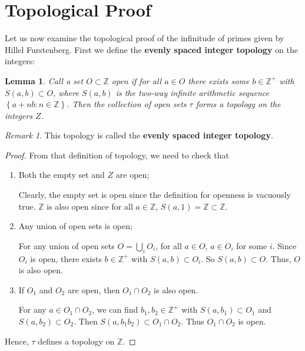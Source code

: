 \documentclass[a4paper]{article}
\newtheorem{lemma}[theorem]{Lemma}
\theoremstyle{definition}
\theoremstyle{remark}
\newtheorem*{remark}{Remark}
\begin{document}
\section{Topological Proof}
Let us now examine the topological proof of the infinitude of primes given by Hillel Furstenberg.
First we define the \textbf{evenly spaced integer topology} on the integers:
\begin{lemma}
  Call a set $O\subset\mathbb{Z}$ open if for all $a\in O$ there exists some $b\in\mathbb{Z^+}$ with $S(a,b)\subset O$, where $S(a,b)$ is the two-way infinite arithmetic sequence $\left\{ a+nb:n\in\mathbb{Z} \right\}$. Then the collection of open sets $\tau$ forms a topology on the integers $Z$.
  \label{lem:esip}
\end{lemma}
\begin{remark}
  This topology is called the \textbf{evenly spaced integer topology}.
  \label{rem:esip}
\end{remark}
\begin{proof}
  From that definition of topology, we need to check that
  \begin{enumerate}
    \item Both the empty set and $Z$ are open;

      Clearly, the empty set is open since the definition for openness is vacuously true. $\mathbb{Z}$ is also open since for all $a\in\mathbb{Z}$, $S(a,1)=\mathbb{Z}\subset\mathbb{Z}$.
    \item Any union of open sets is open;

      For any union of open sets $O=\bigcup\limits_i O_i$, for all $a\in O$, $a\in O_i$ for some $i$. Since $O_i$ is open, there exists $b\in\mathbb{Z^+}$ with $S(a,b)\subset O_i$. So $S(a,b)\subset O$. Thus, $O$ is also open.
    \item If $O_1$ and $O_2$ are open, then $O_1\cap O_2$ is also open.

      For any $a\in O_1\cap O_2$, we can find $b_1,b_2\in\mathbb{Z^+}$ with $S(a,b_1)\subset O_1$ and $S(a,b_2)\subset O_2$. Then $S(a,b_1b_2)\subset O_1\cap O_2$. Thus $O_1\cap O_2$ is open.

  \end{enumerate}
  Hence, $\tau$ defines a topology on $\mathbb{Z}$.
\end{proof}
\end{document}
